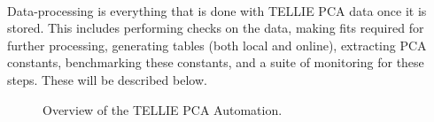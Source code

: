 \documentclass[12pt]{article}
\begin{document}
\paragraph{}
Data-processing is everything that is done with TELLIE PCA data once it is stored. This includes performing checks on the data, making fits required for further processing, generating tables (both local and online), extracting PCA constants, benchmarking these constants, and a suite of monitoring for these steps. These will be described below.

\begin{figure}
\centering
\noindent{}
  \caption{\centering Overview of the TELLIE PCA Automation.}
  \label{fig:overview}
\end{figure}
\end{document}
